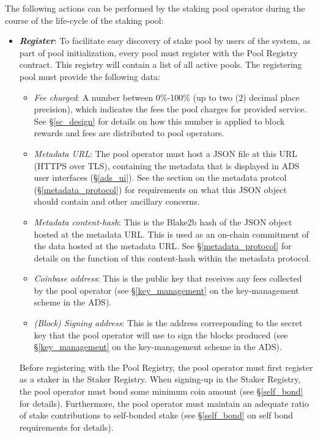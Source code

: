 The following actions can be performed by the staking pool operator during the course of the life-cycle of the staking pool: 
\begin{itemize}
    \item \textbf{\textit{Register}}: To facilitate easy discovery of stake pool by users of the system, as part of pool initialization, every pool must register with the Pool Registry contract. This registry will contain a list of all active pools. The registering pool must provide the following data: 
    \begin{itemize}
        \item \textit{Fee charged}: A number between 0\%-100\% (up to two (2) decimal place precision), which indicates the fees the pool charges for provided service. See \S\ref{sc_design} for details on how this number is applied to block rewards and fees are distributed to pool operators. 
        \item \textit{Metadata URL}: The pool operator must host a JSON file at this URL (HTTPS over TLS), containing the metadata that is displayed in ADS user interfaces (\S\ref{ads_ui}). See the section on the metadata protcol (\S\ref{metadata_protocol}) for requirements on what this JSON object should contain and other ancillary concerns. 
        \item \textit{Metadata content-hash}: This is the Blake2b hash of the JSON object hosted at the metadata URL. This is used as an on-chain commitment of the data hosted at the metadata URL. See \S\ref{metadata_protocol} for details on the function of this content-hash within the metadata protocol. 
        \item \textit{Coinbase address}: This is the public key that receives any fees collected by the pool operator (see \S\ref{key_management} on the key-management scheme in the ADS). 
        \item \textit{(Block) Signing address}: This is the address corresponding to the secret key that the pool operator will use to sign the blocks produced (see \S\ref{key_management} on the key-management scheme in the ADS). 
    \end{itemize}
    
    Before registering with the Pool Registry, the pool operator must first register as a staker in the Staker Registry. When signing-up in the Staker Registry, the pool operator must bond some minimum coin amount (see \S\ref{self_bond} for details). Furthermore, the pool operator must maintain an adequate ratio of stake contributions to self-bonded stake (see \S\ref{self_bond} on self bond requirements for details).
    

\end{itemize}
